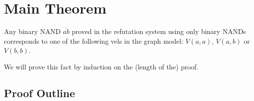 \section{Main Theorem}
\label{sec:Main Theorem}
\begin{theorem}
  Any binary NAND $\overline{ab}$ proved in the refutation system using only binary NANDs corresponds to one of the following vels in the graph model: $V(a,a)$, $V(a,b)$ or $V(b,b)$.
\end{theorem}
We will prove this fact by induction on the (length of the) proof.
\pagebreak
\subsection{Proof Outline}
\label{sub:Proof Outline}
